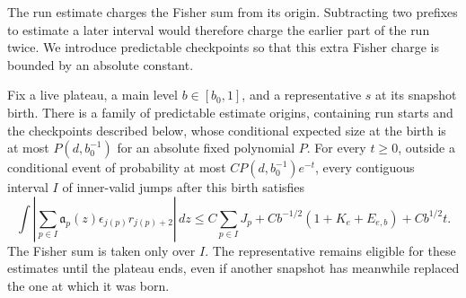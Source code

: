 The run estimate charges the Fisher sum from its origin. Subtracting two
prefixes to estimate a later interval would therefore charge the earlier
part of the run twice. We introduce predictable checkpoints so that this
extra Fisher charge is bounded by an absolute constant.

\begin{proposition}
\label{prop:vector-path}
Fix a live plateau, a main level $b\in[b_0,1]$, and a representative $s$
at its snapshot birth.  There is a family of predictable estimate origins,
containing run starts and the checkpoints described below, whose
conditional expected size at the birth is at most
$P(d,b_0^{-1})$ for an absolute fixed polynomial $P$.
For every $t\ge0$, outside a conditional event of probability at most
$C P(d,b_0^{-1})e^{-t}$, every contiguous interval $I$ of inner-valid jumps
after this birth satisfies
\begin{equation}
 \int\left|\sum_{p\in I}\mathfrak a_p(z)\epsilon_{j(p)}r_{j(p)+2}\right|\,dz
 \le C\sum_{p\in I}J_p
       +Cb^{-1/2}(1+K_e+E_{e,b})+Cb^{1/2}t.
 \label{eq:paths-inner-interval}
\end{equation}
The Fisher sum is taken only over $I$.  The representative remains
eligible for these estimates until the plateau ends, even if another
snapshot has meanwhile replaced the one at which it was born.
\end{proposition}

